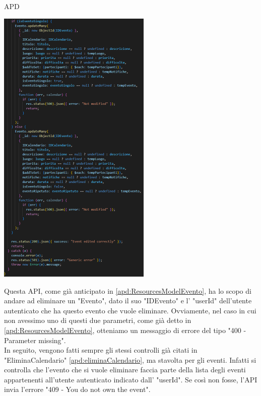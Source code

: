 \begin{listaPersonale} {APD}
\begin{listaPersonale2}[APD]{}
\begin{center}
                    \includegraphics[width=0.55\textwidth, height=0.6\textheight]{img/png/APIs/modificaEvento3.png}
                \end{center}
                Questa API, come già anticipato in \ref{apd:ResourcesModelEvento}, ha lo scopo di andare ad eliminare un "Evento", dato il suo "IDEvento" e l' "userId" dell'utente autenticato che ha questo evento che vuole eliminare. Ovviamente, nel caso in cui non avessimo uno di questi due parametri, come già detto in \ref{apd:ResourcesModelEvento}, otteniamo un messaggio di errore del tipo "400 - Parameter missing". \\
                In seguito, vengono fatti sempre gli stessi controlli già citati in "EliminaCalendario" \ref{apd:eliminaCalendario}, ma stavolta per gli eventi. Infatti si controlla che l'evento che si vuole eliminare faccia parte della lista degli eventi appartenenti all'utente autenticato indicato dall' "userId". Se così non fosse, l'API invia l'errore "409 - You do not own the event". \\

\end{listaPersonale2}
\end{listaPersonale}
